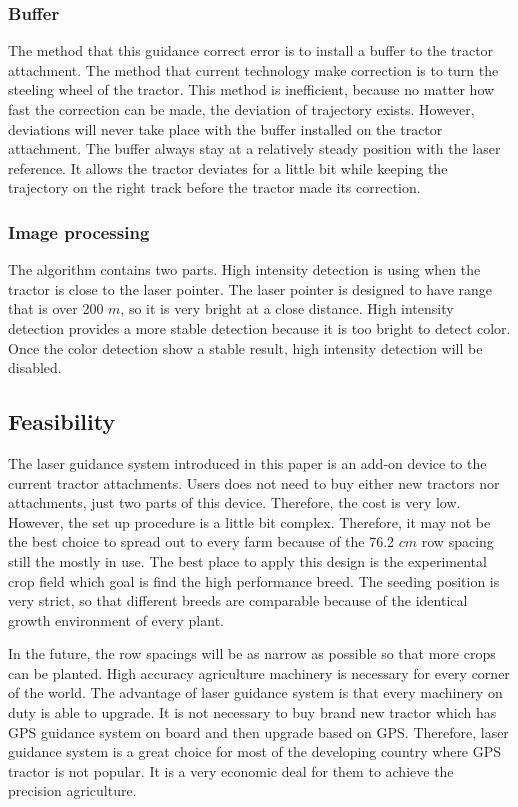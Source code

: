 \documentclass[12pt]{article}
\begin{document}
\begin{flushleft}
\subsubsection{Buffer}
The method that this guidance correct error is to install a buffer to the tractor attachment. The method that current technology make correction is to turn the steeling wheel of the tractor. This method is inefficient, because no matter how fast the correction can be made, the deviation of trajectory exists. However, deviations will never take place with the buffer installed on the tractor attachment. The buffer always stay at a relatively steady position with the laser reference. It allows the tractor deviates for a little bit while keeping the trajectory on the right track before the tractor made its correction.

\subsubsection{Image processing}
The algorithm contains two parts. High intensity detection is using when the tractor is close to the laser pointer. The laser pointer is designed to have range that is over 200 $m$, so it is very bright at a close distance. High intensity detection provides a more stable detection because it is too bright to detect color. Once the color detection show a stable result, high intensity detection will be disabled. 


\subsection{Feasibility}
The laser guidance system introduced in this paper is an add-on device to the current tractor attachments. Users does not need to buy either new tractors nor attachments, just two parts of this device. Therefore, the cost is very low. However, the set up procedure is a little bit complex. Therefore, it may not be the best choice to spread out to every farm because of the 76.2 $cm$ row spacing still the mostly in use. The best place to apply this design is the experimental crop field which goal is find the high performance breed. The seeding position is very strict, so that different breeds are comparable because of the identical growth environment of every plant. 

In the future, the row spacings will be as narrow as possible so that more crops can be planted. High accuracy agriculture machinery is necessary for every corner of the world. The advantage of laser guidance system is that every machinery on duty is able to upgrade. It is not necessary to buy brand new tractor which has GPS guidance system on board and then upgrade based on GPS. Therefore, laser guidance system is a great choice for most of the developing country where GPS tractor is not popular. It is a very economic deal for them to achieve the precision agriculture.



\end{flushleft}
\end{document}
